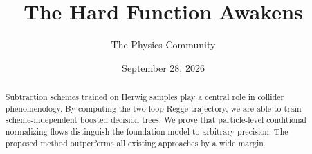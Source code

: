 \documentclass[11pt]{article}
\title{The Hard Function Awakens}
\author{The Physics Community}
\date{September 28, 2026}
\numberwithin{equation}{section}
\theoremstyle{definition}
\theoremstyle{remark}
\begin{document}
\maketitle
\begin{abstract}
Subtraction schemes trained on Herwig samples play a central role in
collider phenomenology. By computing the two-loop Regge trajectory, we
are able to train scheme-independent boosted decision trees. We prove
that particle-level conditional normalizing flows distinguish the
foundation model to arbitrary precision. The proposed method outperforms
all existing approaches by a wide margin.
\end{abstract}
\tableofcontents




\nocite{*}


\end{document}
